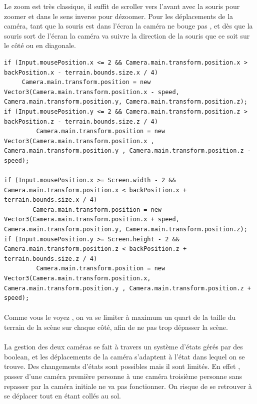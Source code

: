 \documentclass{report}
\begin{document}
Le zoom est très classique, il suffit de scroller vers l’avant avec la souris pour zoomer et dans le sens inverse pour dézoomer. Pour les déplacements de la caméra, tant que la souris est dans l’écran la caméra ne bouge pas , et dès que la souris sort de l’écran la caméra va suivre la direction de la souris que ce soit sur le côté ou en diagonale.
\begin{lstlisting}[frame=single]
 if (Input.mousePosition.x <= 2 && Camera.main.transform.position.x > backPosition.x - terrain.bounds.size.x / 4)
     Camera.main.transform.position = new Vector3(Camera.main.transform.position.x - speed, Camera.main.transform.position.y, Camera.main.transform.position.z);
if (Input.mousePosition.y <= 2 && Camera.main.transform.position.z > backPosition.z - terrain.bounds.size.z / 4)
         Camera.main.transform.position = new Vector3(Camera.main.transform.position.x , Camera.main.transform.position.y , Camera.main.transform.position.z - speed);

if (Input.mousePosition.x >= Screen.width - 2 && Camera.main.transform.position.x < backPosition.x + terrain.bounds.size.x / 4)
        Camera.main.transform.position = new Vector3(Camera.main.transform.position.x + speed, Camera.main.transform.position.y, Camera.main.transform.position.z);
if (Input.mousePosition.y >= Screen.height - 2 && Camera.main.transform.position.z < backPosition.z + terrain.bounds.size.z / 4)
         Camera.main.transform.position = new Vector3(Camera.main.transform.position.x, Camera.main.transform.position.y , Camera.main.transform.position.z + speed);
 \end{lstlisting}

\paragraph{}
Comme vous le voyez , on va se limiter à maximum un quart de la taille du terrain de la scène sur chaque côté, afin de ne pas trop dépasser la scène.
\paragraph{}
La gestion des deux caméras se fait à travers un système d’états gérés par des boolean, et les déplacements de la caméra s’adaptent à l’état dans lequel on se trouve.
Des changements d’états sont possibles mais il sont limités. En effet , passer d’une caméra première personne à une caméra troisième personne sans repasser par la caméra initiale ne va pas fonctionner.  On risque de se retrouver à se déplacer tout en étant collés au sol.
\end{document}
